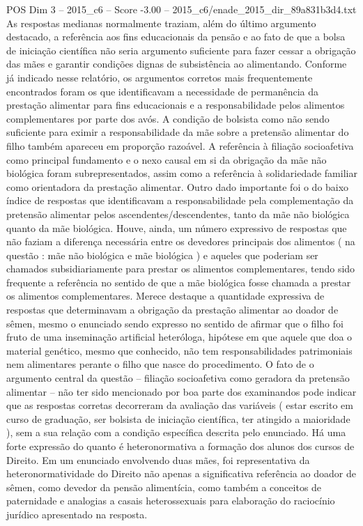 \begin{textsample}{POS Dim 3 – 2015\_c6 – Score -3.00 – 2015\_c6/enade\_2015\_dir\_89a831b3d4.txt}
As respostas medianas normalmente traziam, além do último argumento destacado, a referência aos fins educacionais da pensão e ao fato de que a bolsa de iniciação científica não seria argumento suficiente para fazer cessar a obrigação das mães e garantir condições dignas de subsistência ao alimentando.
Conforme já indicado nesse relatório, os argumentos corretos mais frequentemente encontrados foram os que identificavam a necessidade de permanência da prestação alimentar para fins educacionais e a responsabilidade pelos alimentos complementares por parte dos avós.
A condição de bolsista como não sendo suficiente para eximir a responsabilidade da mãe sobre a pretensão alimentar do filho também apareceu em proporção razoável.
A referência à filiação socioafetiva como principal fundamento e o nexo causal em si da obrigação da mãe não biológica foram subrepresentados, assim como a referência à solidariedade familiar como orientadora da prestação alimentar.
Outro dado importante foi o do baixo índice de respostas que identificavam a responsabilidade pela complementação da pretensão alimentar pelos ascendentes/descendentes, tanto da mãe não biológica quanto da mãe biológica.
Houve, ainda, um número expressivo de respostas que não faziam a diferença necessária entre os devedores principais dos alimentos ( na questão : mãe não biológica e mãe biológica ) e aqueles que poderiam ser chamados subsidiariamente para prestar os alimentos complementares, tendo sido frequente a referência no sentido de que a mãe biológica fosse chamada a prestar os alimentos complementares.
Merece destaque a quantidade expressiva de respostas que determinavam a obrigação da prestação alimentar ao doador de sêmen, mesmo o enunciado sendo expresso no sentido de afirmar que o filho foi fruto de uma inseminação artificial heteróloga, hipótese em que aquele que doa o material genético, mesmo que conhecido, não tem responsabilidades patrimoniais nem alimentares perante o filho que nasce do procedimento.
O fato de o argumento central da questão – filiação socioafetiva como geradora da pretensão alimentar – não ter sido mencionado por boa parte dos examinandos pode indicar que as respostas corretas decorreram da avaliação das variáveis ( estar escrito em curso de graduação, ser bolsista de iniciação científica, ter atingido a maioridade ), sem a sua relação com a condição específica descrita pelo enunciado.
Há uma forte expressão do quanto é heteronormativa a formação dos alunos dos cursos de Direito.
Em um enunciado envolvendo duas mães, foi representativa da heteronormatividade do Direito não apenas a significativa referência ao doador de sêmen, como devedor da pensão alimentícia, como também a conceitos de paternidade e analogias a casais heterossexuais para elaboração do raciocínio jurídico apresentado na resposta.

\end{textsample}

